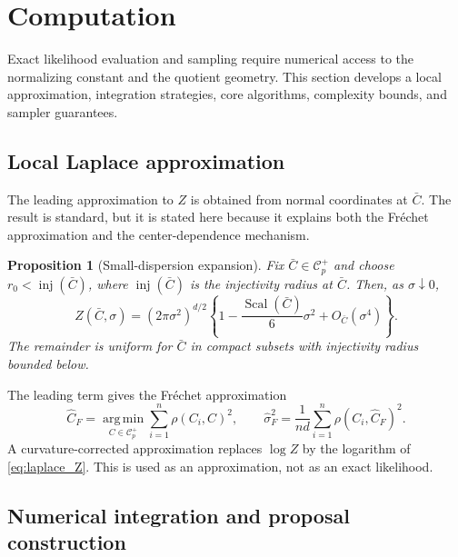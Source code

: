 \documentclass[
  12pt]{article}
\newcommand{\Corr}{\mathcal C^+}
\newcommand{\Scal}{\operatorname{Scal}}
\newcommand{\argmin}{\operatorname*{arg\,min}}
\newtheorem{proposition}{Proposition}
\begin{document}
\section{Computation}\label{sec:computation}

Exact likelihood evaluation and sampling require numerical access to the normalizing constant and the quotient geometry. This section develops a local approximation, integration strategies, core algorithms, complexity bounds, and sampler guarantees.

\subsection{Local Laplace approximation}

The leading approximation to $Z$ is obtained from normal coordinates at $\bar C$. The result is standard, but it is stated here because it explains both the Fr\'echet approximation and the center-dependence mechanism.

\begin{proposition}[Small-dispersion expansion]\label{prop:laplace}
Fix $\bar C\in\Corr_p$ and choose $r_0<\operatorname{inj}(\bar C)$, where $\operatorname{inj}(\bar C)$ is the injectivity radius at $\bar C$. Then, as $\sigma\downarrow0$,
\begin{equation}\label{eq:laplace_Z}
Z(\bar C,\sigma)=(2\pi\sigma^2)^{d/2}\left\{1-\frac{\Scal(\bar C)}{6}\sigma^2+O_{\bar C}(\sigma^4)\right\}.
\end{equation}
The remainder is uniform for $\bar C$ in compact subsets with injectivity radius bounded below.
\end{proposition}

The leading term gives the Fr\'echet approximation
\begin{equation}\label{eq:frechet_estimator}
\widehat C_F=\argmin_{C\in\Corr_p}\sum_{i=1}^n\rho(C_i,C)^2,
\qquad
\widehat\sigma_F^2=\frac1{nd}\sum_{i=1}^n\rho(C_i,\widehat C_F)^2.
\end{equation}
A curvature-corrected approximation replaces $\log Z$ by the logarithm of \eqref{eq:laplace_Z}. This is used as an approximation, not as an exact likelihood.


\subsection{Numerical integration and proposal construction}\label{sec:integration_regimes}
\end{document}
